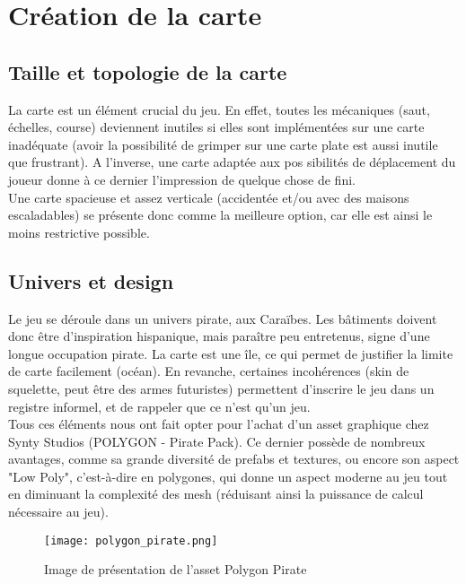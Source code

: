 \documentclass[../doc.tex]{subfiles}
\begin{document}
    \section{Création de la carte}

    \subsection{Taille et topologie de la carte}
    
    La carte est un élément crucial du jeu. En effet, toutes les mécaniques 
    (saut, échelles, course)
    deviennent inutiles si elles sont implémentées sur une carte inadéquate (avoir la 
    possibilité de grimper sur une carte plate est aussi inutile que frustrant).
    A l'inverse, une carte adaptée aux pos
    sibilités de déplacement du joueur donne à ce dernier
    l'impression de quelque chose de fini.
    \\

    Une carte spacieuse et assez verticale (accidentée et/ou avec des maisons escaladables)
    se présente donc comme la meilleure option, car elle est ainsi le moins restrictive possible.

    \subsection{Univers et design}

    Le jeu se déroule dans un univers pirate, aux Caraïbes.
    Les bâtiments doivent donc être d'inspiration hispanique,
    mais paraître peu entretenus, signe d'une longue occupation 
    pirate. La carte est une île, ce qui permet de justifier
    la limite de carte facilement (océan). En revanche, certaines 
    incohérences (skin de squelette, peut être des armes futuristes)
    permettent d'inscrire le jeu dans un registre informel, et de 
    rappeler que ce n'est qu'un jeu.
    \\

    Tous ces éléments nous ont fait opter pour l'achat d'un asset graphique chez 
    Synty Studios (POLYGON - Pirate Pack).
    Ce dernier possède de nombreux avantages, comme sa grande diversité de prefabs et 
    textures, ou encore son aspect "Low Poly", 
    c'est-à-dire en polygones, qui donne un aspect moderne au jeu tout en diminuant la 
    complexité des mesh (réduisant ainsi la 
    puissance de calcul nécessaire au jeu).
    \\ 

    \begin{figure}[!ht]
        \centering
        \texttt{[image: polygon\_pirate.png]}
        \caption{Image de présentation de l'asset Polygon Pirate}
    \end{figure}
        

    
    
\end{document}
